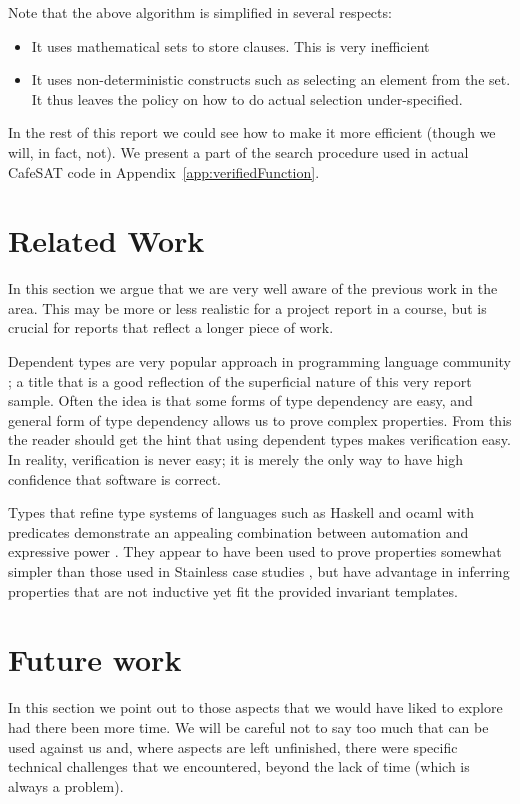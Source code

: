 \documentclass[a4paper,UKenglish,cleveref, autoref, thm-restate]{lipics-v2021}
\begin{document}
Note that the above algorithm is simplified in several respects:
\begin{itemize}
\item It uses mathematical sets to store clauses. This is very inefficient
\item It uses non-deterministic constructs such as selecting an element from the set. It thus leaves the policy on how to do actual selection under-specified.
\end{itemize}
In the rest of this report we could see how to make it more efficient (though we will, in fact, not).
We present a part of the search procedure used in actual CafeSAT code in Appendix~\ref{app:verifiedFunction}.

\section{Related Work}

In this section we argue that we are very well aware of the previous work in the area.
This may be more or less realistic for a project report in a course, but is crucial for reports that
reflect a longer piece of work.

Dependent types are very popular approach in programming language community \cite{fakingIt}; a title
that is a good reflection of the superficial nature of this very report sample.
Often the idea is that some forms of type dependency are easy, and general form of type dependency
allows us to prove complex properties. From this the reader should get the hint that using dependent
types makes verification easy. In reality, verification is never easy; it is merely the only way
to have high confidence that software is correct.

Types that refine type systems of languages such as Haskell and ocaml with predicates demonstrate
an appealing combination between automation and expressive power \cite{vazou15bounded}. They appear
to have been used to prove properties somewhat simpler than those used in Stainless case studies
\cite{HamzaETAL19SystemFR}, but have advantage in inferring properties that are not inductive
yet fit the provided invariant templates.

\section{Future work}

In this section we point out to those aspects that we would have liked to explore had there been
more time. We will be careful not to say too much that can be used against us and, where aspects
are left unfinished, there were specific technical challenges that we encountered, beyond the lack
of time (which is always a problem).
\end{document}
